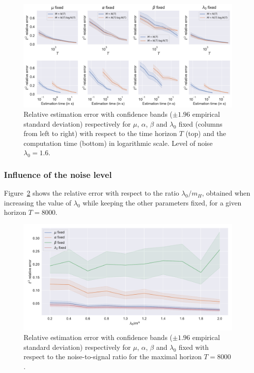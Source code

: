     \begin{figure}[!ht]
        \centering
        \includegraphics[width=\textwidth]{images/chapter4//l2_error_wrt_nbpoints.pdf}
        \caption{Relative estimation error with confidence bands ($\pm 1.96$ empirical standard deviation) respectively for \(\mu\), \(\alpha\), \(\beta\) and \(\lambda_0\) fixed (columns from left to right)
        with respect to the time horizon $T$ (top) and the computation time (bottom) in logarithmic scale. Level of noise $\lambda_0 = 1.6$.}
        \label{fig:chap4_errors_wrt_T}
    \end{figure}
  



    \subsubsection{Influence of the noise level}\label{sec:chap4_influence_noise}
       Figure~\ref{fig:chap4_errors_wrt_noise_N} shows the relative error with respect to the ratio $\lambda_0/m_H$, obtained when increasing the value of $\lambda_0$ while keeping the other parameters fixed, for a given horizon $T=8000$.

       \begin{figure}[!ht]
        \centering
        \includegraphics[width=\textwidth]{images/chapter4//vector_max_hor_wrt_noise_N.pdf}
        \caption{Relative estimation error with confidence bands ($\pm 1.96$ empirical standard deviation) respectively for \(\mu\), \(\alpha\), \(\beta\) and \(\lambda_0\) fixed 
        with respect to the noise-to-signal ratio for the maximal horizon $T=8000$.} 
        \label{fig:chap4_errors_wrt_noise_N}
        \end{figure}
        

